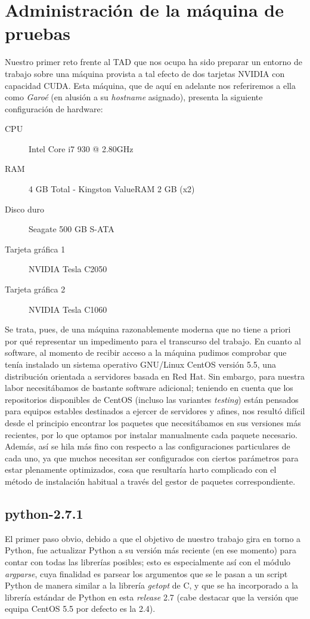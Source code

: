 \documentclass[twoside]{article}
\begin{document}

\section{Administración de la máquina de pruebas}

Nuestro primer reto frente al TAD que nos ocupa ha sido preparar un entorno de trabajo sobre una máquina provista a tal efecto de dos tarjetas NVIDIA con capacidad CUDA. Esta máquina, que de aquí en adelante nos referiremos a ella como \emph{Garoé} (en alusión a su \emph{hostname} asignado), presenta la siguiente configuración de hardware:

\begin{description}
   \item[CPU] Intel Core i7 930 @ 2.80GHz
   \item[RAM] 4 GB Total - Kingston ValueRAM 2 GB (x2)
   \item[Disco duro] Seagate 500 GB S-ATA
   \item[Tarjeta gráfica 1] NVIDIA Tesla C2050
   \item[Tarjeta gráfica 2] NVIDIA Tesla C1060
\end{description}

Se trata, pues, de una máquina razonablemente moderna que no tiene a priori por qué representar un impedimento para el transcurso del trabajo. En cuanto al software, al momento de recibir acceso a la máquina pudimos comprobar que tenía instalado un sistema operativo GNU/Linux CentOS versión 5.5, una distribución orientada a servidores basada en Red Hat. Sin embargo, para nuestra labor necesitábamos de bastante software adicional; teniendo en cuenta que los repositorios disponibles de CentOS (incluso las variantes \emph{testing}) están pensados para equipos estables destinados a ejercer de servidores y afines, nos resultó difícil desde el principio encontrar los paquetes que necesitábamos en sus versiones más recientes, por lo que optamos por instalar manualmente cada paquete necesario. Además, así se hila más fino con respecto a las configuraciones particulares de cada uno, ya que muchos necesitan ser configurados con ciertos parámetros para estar plenamente optimizados, cosa que resultaría harto complicado con el método de instalación habitual a través del gestor de paquetes correspondiente.

\subsection{python-2.7.1}
El primer paso obvio, debido a que el objetivo de nuestro trabajo gira en torno a Python, fue actualizar Python a su versión más reciente (en ese momento) para contar con todas las librerías posibles; esto es especialmente así con el módulo \emph{argparse}, cuya finalidad es parsear los argumentos que se le pasan a un script Python de manera similar a la librería \emph{getopt} de C, y que se ha incorporado a la librería estándar de Python en esta \emph{release} 2.7 (cabe destacar que la versión que equipa CentOS 5.5 por defecto es la 2.4).
\end{document}

